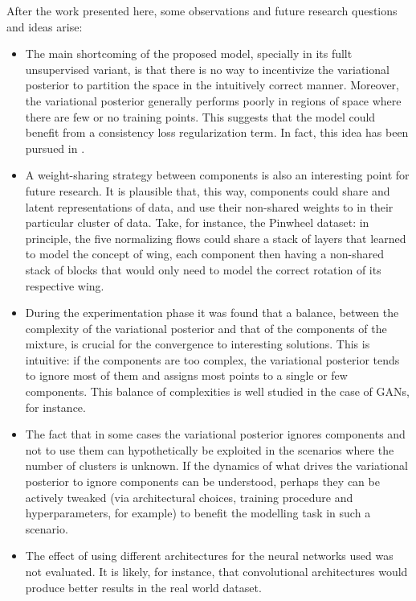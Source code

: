 After the work presented here, some observations and future research questions
and ideas arise:
\begin{itemize}
    \item The main shortcoming of the proposed model, specially in its fullt
    unsupervised variant, is that there is no way to incentivize the variational
    posterior to partition the space in the intuitively correct manner. Moreover, the
    variational posterior generally performs poorly in regions of space where there are few
    or no training points. This suggests that the model could benefit from a consistency
    loss regularization term. In fact, this idea has been pursued in \autocite{semisuplearning_nflows}.
    \item A weight-sharing strategy between components is also an interesting
    point for future research. It is plausible that, this way, components could
    share  and latent representations of data, and use their non-shared
    weights to  in their particular cluster of data. Take,
    for instance, the Pinwheel dataset: in principle, the five normalizing flows
    could share a stack of layers that learned to model the concept of wing,
    each component then having a non-shared stack of blocks that would only
    need to model the correct rotation of its respective wing.
    \item During the experimentation phase it was found that a balance, between
    the complexity of the variational posterior and that of the components of
    the mixture, is crucial for the convergence to interesting solutions. This
    is intuitive: if the components are too complex, the variational posterior
    tends to ignore most of them and assigns most points to a single or few components.
    This balance of complexities is well studied in the case of GANs, for instance.
    \item The fact that in some cases the variational posterior ignores components
    and  not to use them can hypothetically be exploited in the scenarios
    where the number of clusters is unknown. If the dynamics of what drives the
    variational posterior to ignore components can be understood, perhaps they
    can be actively tweaked (via architectural choices, training procedure and
    hyperparameters, for example) to benefit the modelling task in such a scenario.
    \item The effect of using different architectures for the neural networks used
    was not evaluated. It is likely, for instance, that convolutional architectures
    would produce better results in the real world dataset.
\end{itemize}

